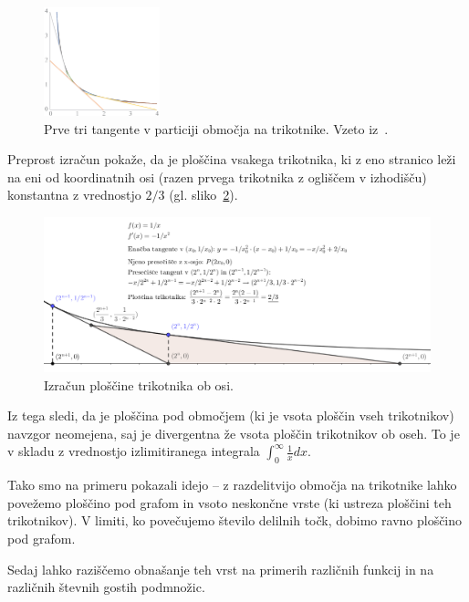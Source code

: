 \documentclass[a4paper, 12pt, titlepage]{article}
\begin{document}
\begin{figure}[h]
    \centering
    \includegraphics[width=0.3\textwidth]{slike/uvodni_primer_prvi_trikotniki.png}
    \caption{Prve tri tangente v particiji območja na trikotnike. Vzeto iz~\cite{osnovni_clanek}.}
    \label{uvodni_primer_prvi_trikotniki}
\end{figure}

Preprost izračun pokaže, da je ploščina vsakega trikotnika, ki z eno stranico leži na eni od koordinatnih osi (razen prvega trikotnika z ogliščem v izhodišču) konstantna z vrednostjo $ 2/3 $ (gl. sliko~\ref{ploscina_trikotnika_2^n}).

\begin{figure}[h]
    \centering
    \includegraphics[width=\textwidth]{slike/ploscina_trikotnika_2^n.png}
    \caption{Izračun ploščine trikotnika ob osi.}
    \label{ploscina_trikotnika_2^n}
\end{figure}

Iz tega sledi, da je ploščina pod območjem (ki je vsota ploščin vseh trikotnikov) navzgor neomejena, saj je divergentna že vsota ploščin trikotnikov ob oseh. To je v skladu z vrednostjo izlimitiranega integrala $ \int_{0}^{\infty}\frac{1}{x}dx $.

Tako smo na primeru pokazali idejo -- z razdelitvijo območja na trikotnike lahko povežemo ploščino pod grafom in vsoto neskončne vrste (ki ustreza ploščini teh trikotnikov). V limiti, ko povečujemo število delilnih točk, dobimo ravno ploščino pod grafom.

Sedaj lahko raziščemo obnašanje teh vrst na primerih različnih funkcij in na različnih števnih gostih podmnožic.
\end{document}
